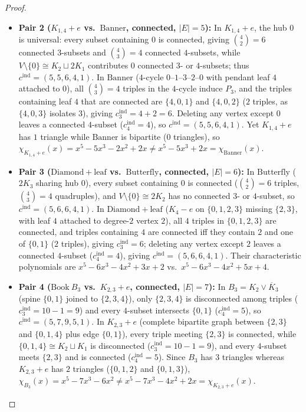 \documentclass[11pt]{article}
\theoremstyle{definition}
\newcommand{\cind}{c^{\mathrm{ind}}}
\begin{document}
\begin{proof}
\begin{itemize}
  \item \textbf{Pair 2 ($K_{1,4} + e$ vs.\ $\mathrm{Banner}$, connected, $|E| = 5$):} In $K_{1,4} + e$, the hub $0$ is universal: every subset containing $0$ is connected, giving $\binom{4}{2} = 6$ connected $3$-subsets and $\binom{4}{3} = 4$ connected $4$-subsets, while $V \setminus \{0\} \cong K_2 \sqcup 2K_1$ contributes $0$ connected $3$- or $4$-subsets; thus $\cind = (5,5,6,4,1)$. In $\mathrm{Banner}$ ($4$-cycle $0\text{--}1\text{--}3\text{--}2\text{--}0$ with pendant leaf $4$ attached to $0$), all $\binom{4}{3} = 4$ triples in the $4$-cycle induce $P_3$, and the triples containing leaf $4$ that are connected are $\{4,0,1\}$ and $\{4,0,2\}$ ($2$ triples, as $\{4,0,3\}$ isolates $3$), giving $\cind_3 = 4 + 2 = 6$. Deleting any vertex except $0$ leaves a connected $4$-subset ($\cind_4 = 4$), so $\cind = (5,5,6,4,1)$. Yet $K_{1,4} + e$ has $1$ triangle while $\mathrm{Banner}$ is bipartite ($0$ triangles), so $\chi_{K_{1,4}+e}(x) = x^5 - 5x^3 - 2x^2 + 2x \ne x^5 - 5x^3 + 2x = \chi_{\mathrm{Banner}}(x)$.

  \item \textbf{Pair 3 ($\mathrm{Diamond}+\text{leaf}$ vs.\ $\mathrm{Butterfly}$, connected, $|E| = 6$):} In $\mathrm{Butterfly}$ ($2K_3$ sharing hub $0$), every subset containing $0$ is connected ($\binom{4}{2} = 6$ triples, $\binom{4}{3} = 4$ quadruples), and $V \setminus \{0\} \cong 2K_2$ has no connected $3$- or $4$-subset, so $\cind = (5,6,6,4,1)$. In $\mathrm{Diamond}+\text{leaf}$ ($K_4 - e$ on $\{0,1,2,3\}$ missing $\{2,3\}$, with leaf $4$ attached to degree-$2$ vertex $2$), all $4$ triples in $\{0,1,2,3\}$ are connected, and triples containing $4$ are connected iff they contain $2$ and one of $\{0,1\}$ ($2$ triples), giving $\cind_3 = 6$; deleting any vertex except $2$ leaves a connected $4$-subset ($\cind_4 = 4$), giving $\cind = (5,6,6,4,1)$. Their characteristic polynomials are $x^5 - 6x^3 - 4x^2 + 3x + 2$ vs.\ $x^5 - 6x^3 - 4x^2 + 5x + 4$.

  \item \textbf{Pair 4 ($\mathrm{Book}\ B_3$ vs.\ $K_{2,3} + e$, connected, $|E| = 7$):} In $B_3 = K_2 \vee \overline{K}_3$ (spine $\{0,1\}$ joined to $\{2,3,4\}$), only $\{2,3,4\}$ is disconnected among triples ($\cind_3 = 10 - 1 = 9$) and every $4$-subset intersects $\{0,1\}$ ($\cind_4 = 5$), so $\cind = (5,7,9,5,1)$. In $K_{2,3} + e$ (complete bipartite graph between $\{2,3\}$ and $\{0,1,4\}$ plus edge $\{0,1\}$), every triple meeting $\{2,3\}$ is connected, while $\{0,1,4\} \cong K_2 \sqcup K_1$ is disconnected ($\cind_3 = 10 - 1 = 9$), and every $4$-subset meets $\{2,3\}$ and is connected ($\cind_4 = 5$). Since $B_3$ has $3$ triangles whereas $K_{2,3}+e$ has $2$ triangles ($\{0,1,2\}$ and $\{0,1,3\}$), $\chi_{B_3}(x) = x^5 - 7x^3 - 6x^2 \ne x^5 - 7x^3 - 4x^2 + 2x = \chi_{K_{2,3}+e}(x)$.
\end{itemize}


\end{proof}
\end{document}
